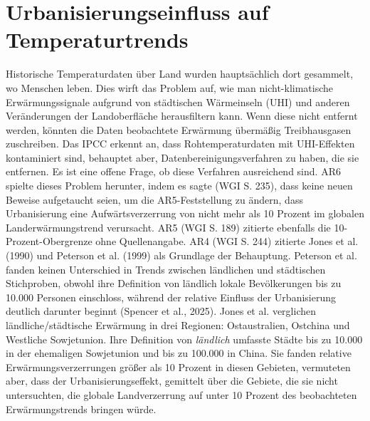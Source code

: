 \documentclass[12pt,paper=a4,DIV=12,parskip=never,chapterprefix=false,headings=standardclasses]{scrreprt}
\numberwithin{figure}{chapter}
\begin{document}
\section{Urbanisierungseinfluss auf Temperaturtrends}
Historische Temperaturdaten über Land wurden hauptsächlich dort gesammelt, wo Menschen leben. Dies wirft das Problem auf, wie man nicht-klimatische Erwärmungssignale aufgrund von städtischen Wärmeinseln (UHI) und anderen Veränderungen der Landoberfläche herausfiltern kann. Wenn diese nicht entfernt werden, könnten die Daten beobachtete Erwärmung übermäßig Treibhausgasen zuschreiben. Das IPCC erkennt an, dass Rohtemperaturdaten mit UHI-Effekten kontaminiert sind, behauptet aber, Datenbereinigungsverfahren zu haben, die sie entfernen. Es ist eine offene Frage, ob diese Verfahren ausreichend sind.
AR6 spielte dieses Problem herunter, indem es sagte (WGI S. 235), dass keine neuen Beweise aufgetaucht seien, um die AR5-Feststellung zu ändern, dass Urbanisierung eine Aufwärtsverzerrung von nicht mehr als 10 Prozent im globalen Landerwärmungstrend verursacht. AR5 (WGI S. 189) zitierte ebenfalls die 10-Prozent-Obergrenze ohne Quellenangabe. AR4 (WGI S. 244) zitierte Jones et al. (1990) und Peterson et al. (1999) als Grundlage der Behauptung. Peterson et al. fanden keinen Unterschied in Trends zwischen ländlichen und städtischen Stichproben, obwohl ihre Definition von ländlich lokale Bevölkerungen bis zu 10.000 Personen einschloss, während der relative Einfluss der Urbanisierung deutlich darunter beginnt (Spencer et al., 2025). Jones et al. verglichen ländliche/städtische Erwärmung in drei Regionen: Ostaustralien, Ostchina und Westliche Sowjetunion. Ihre Definition von \emph{ländlich} umfasste Städte bis zu 10.000 in der ehemaligen Sowjetunion und bis zu 100.000 in China. Sie fanden relative Erwärmungsverzerrungen größer als 10 Prozent in diesen Gebieten, vermuteten aber, dass der Urbanisierungseffekt, gemittelt über die Gebiete, die sie nicht untersuchten, die globale Landverzerrung auf unter 10 Prozent des beobachteten Erwärmungstrends bringen würde.
\end{document}

